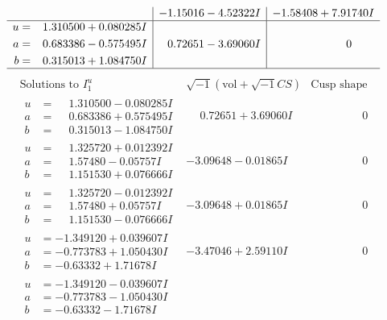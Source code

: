 \documentclass[1p]{elsarticle_modified}
\theoremstyle{definition}
\newcommand{\I}{\sqrt{-1}}
\begin{document}
$$\begin{array}{c|c|c}
 & -1.15016 - 4.52322 I & -1.58408 + 7.91740 I \\ \hline\begin{aligned}
u &= \phantom{-}1.310500 + 0.080285 I \\
a &= \phantom{-}0.683386 - 0.575495 I \\
b &= \phantom{-}0.315013 + 1.084750 I\end{aligned}
 & \phantom{-}0.72651 - 3.69060 I & \phantom{-0.000000 } 0\\
 \hline 
 \end{array}$$\newpage$$\begin{array}{c|c|c}  
\text{Solutions to }I^u_{1}& \I (\text{vol} + \sqrt{-1}CS) & \text{Cusp shape}\\
 \hline 
\begin{aligned}
u &= \phantom{-}1.310500 - 0.080285 I \\
a &= \phantom{-}0.683386 + 0.575495 I \\
b &= \phantom{-}0.315013 - 1.084750 I\end{aligned}
 & \phantom{-}0.72651 + 3.69060 I & \phantom{-0.000000 } 0 \\ \hline\begin{aligned}
u &= \phantom{-}1.325720 + 0.012392 I \\
a &= \phantom{-}1.57480 - 0.05757 I \\
b &= \phantom{-}1.151530 + 0.076666 I\end{aligned}
 & -3.09648 - 0.01865 I & \phantom{-0.000000 } 0 \\ \hline\begin{aligned}
u &= \phantom{-}1.325720 - 0.012392 I \\
a &= \phantom{-}1.57480 + 0.05757 I \\
b &= \phantom{-}1.151530 - 0.076666 I\end{aligned}
 & -3.09648 + 0.01865 I & \phantom{-0.000000 } 0 \\ \hline\begin{aligned}
u &= -1.349120 + 0.039607 I \\
a &= -0.773783 + 1.050430 I \\
b &= -0.63332 + 1.71678 I\end{aligned}
 & -3.47046 + 2.59110 I & \phantom{-0.000000 } 0 \\ \hline\begin{aligned}
u &= -1.349120 - 0.039607 I \\
a &= -0.773783 - 1.050430 I \\
b &= -0.63332 - 1.71678 I\end{aligned}

\end{array}$$
\end{document}
